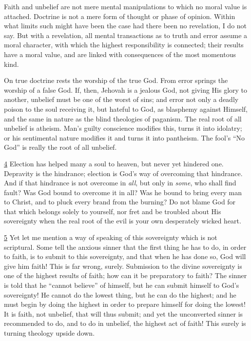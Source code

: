 \documentclass[
]{book}
\begin{document}
Faith and unbelief are not mere mental manipulations to which no moral value is attached. Doctrine is not a mere form of thought or phase of opinion. Within what limits such might have been the case had there been no revelation, I do not say. But with a revelation, all mental transactions as to truth and error assume a moral character, with which the highest responsibility is connected; their results have a moral value, and are linked with consequences of the most momentous kind.

On true doctrine rests the worship of the true God. From error springs the worship of a false God. If, then, Jehovah is a jealous God, not giving His glory to another, unbelief must be one of the worst of sins; and error not only a deadly poison to the soul receiving it, but hateful to God, as blasphemy against Himself, and the same in nature as the blind theologies of paganism. The real root of all unbelief is atheism. Man's guilty conscience modifies this, turns it into idolatry; or his sentimental nature modifies it and turns it into pantheism. The fool's ``No God'' is really the root of all unbelief.

\protect\hyperlink{sdfootnote4anc}{4} Election has helped many a soul to heaven, but never yet hindered one. Depravity is the hindrance; election is God's way of overcoming that hindrance. And if that hindrance is not overcome in \emph{all}, but only in \emph{some}, who shall find fault? Was God bound to overcome it in all? Was he bound to bring every man to Christ, and to pluck every brand from the burning? Do not blame God for that which belongs solely to yourself, nor fret and be troubled about His sovereignty when the real root of the evil is your own desperately wicked heart.

\protect\hyperlink{sdfootnote5anc}{5} Yet let me mention a way of speaking of this sovereignty which is not scriptural. Some tell the anxious sinner that the first thing he has to do, in order to faith, is to submit to this sovereignty, and that when he has done so, God will give him faith! This is far wrong, surely. Submission to the divine sovereignty is one of the highest results of faith; how can it be preparatory to faith? The sinner is told that he ``cannot believe'' of himself, but he can submit himself to God's sovereignty! He cannot do the lowest thing, but he can do the highest; and he must begin by doing the highest in order to prepare himself for doing the lowest! It is faith, not unbelief, that will thus submit; and yet the unconverted sinner is recommended to do, and to do in unbelief, the highest act of faith! This surely is turning theology upside down.
\end{document}
